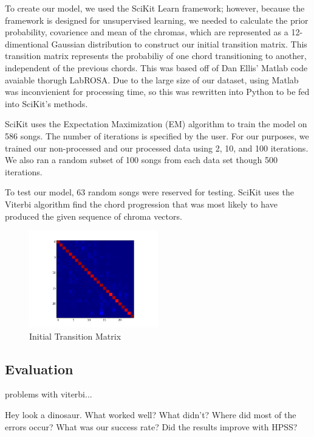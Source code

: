 \documentclass{article}
\begin{document}
To create our model, we used the SciKit Learn framework; however, because the framework is designed for
unsupervised learning, we needed to calculate the prior probability, covarience and mean of the chromas,
which are represented as a 12-dimentional Gaussian distribution to construct our initial transition matrix.
This transition matrix represents the probabiliy of one chord transitioning to another, independent of the
previous chords.  This was based off of Dan Ellis' Matlab code avaiable thorugh LabROSA. Due to the large size of our dataset, using Matlab was inconvienient for processing time, so this was rewritten into Python to be fed
into SciKit's methods.

SciKit uses the Expectation Maximization (EM) algorithm to train the model on 586 songs. The number of iterations is specified by the user. For our purposes, we trained our non-processed and our processed data using 2, 10, and 100 iterations. We also ran a random subset of 100 songs from each data set though 500 iterations. 

To test our model, 63 random songs were reserved for testing. SciKit uses the Viterbi algorithm find the
chord progression that was most likely to have produced the given sequence of chroma vectors.


\begin{figure}
   \centering
   \includegraphics[width=0.5\textwidth]{trans-h.png}
   \caption{Initial Transition Matrix}
   \label{fig:transmath}
\end{figure}

\subsection{Evaluation}

\cite{Danellis:23} problems with viterbi...

Hey look a dinosaur.
What worked well? What didn't? Where did most of the errors occur?
What was our success rate? Did the results improve with HPSS?
\end{document}
